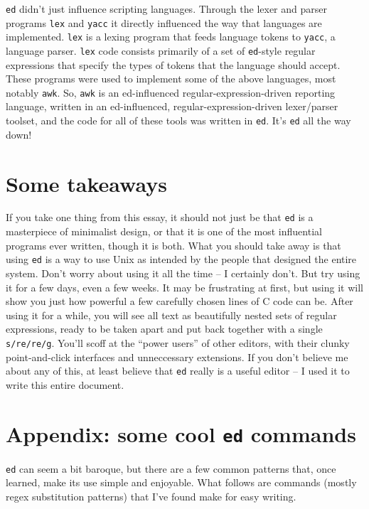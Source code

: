 \documentclass[12pt]{article}
\begin{document}
\lstinline{ed} didn't just influence scripting languages. Through the lexer and parser
programs \lstinline{lex} and \lstinline{yacc} it directly influenced the way that
languages are implemented. \lstinline{lex} is a lexing program that feeds
language tokens to \lstinline{yacc}, a language parser. \lstinline{lex} code consists
primarily of a set of \lstinline{ed}-style regular expressions that specify
the types of tokens that the language should accept. These programs were used to implement
some of the above languages, most notably \lstinline{awk}. So, \lstinline{awk} is an ed-influenced
regular-expression-driven reporting language, written in an ed-influenced, regular-expression-driven lexer/parser toolset,
and the code for all of these tools was written in \lstinline{ed}. It's \lstinline{ed} all the way down!

\section{Some takeaways}

If you take one thing from this essay, it should not just be that \lstinline{ed} is
a masterpiece of minimalist design, or that it is one of the most influential programs
ever written, though it is both. What you should take away is that using \lstinline{ed}
is a way to use Unix as intended by the people that designed
the entire system. Don't worry about using it all the time -- I certainly don't. But try
using it for a few days, even a few weeks. It may be frustrating at first, but using
it will show you just how powerful a few carefully chosen lines of C code can be.
After using it for a while, you will see all text as beautifully nested sets of
regular expressions, ready to be taken apart and put back together with a single
\lstinline{s/re/re/g}. You'll scoff at the ``power users'' of other editors,
with their clunky point-and-click interfaces and unneccessary extensions.
If you don't believe me about any of this, at least believe that \lstinline{ed} really
is a useful editor -- I used it to write this entire document.

\section{Appendix: some cool \lstinline{ed} commands}

\lstinline{ed} can seem a bit baroque, but there are a few common patterns that, once learned,
make its use simple and enjoyable. What follows are commands (mostly regex
substitution patterns) that I've found make for easy writing.
\end{document}
